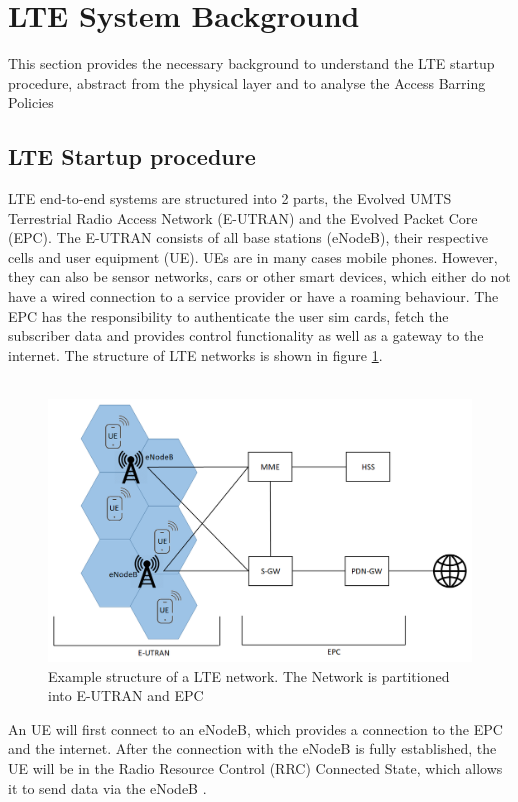 \documentclass[conference]{IEEEtran}
\begin{document}
\section{LTE System Background}
This section provides the necessary background to understand the LTE startup procedure, abstract from the physical layer and to analyse the Access Barring Policies
\subsection{LTE Startup procedure}
LTE end-to-end systems are structured into 2 parts, the Evolved UMTS Terrestrial Radio Access Network (E-UTRAN) and the Evolved Packet Core (EPC).
The E-UTRAN consists of all base stations (eNodeB), their respective cells and user equipment (UE).
UEs are in many cases mobile phones.
However, they can also be sensor networks, cars or other smart devices, which either do not have a wired connection to a service provider or have a roaming behaviour.
The EPC has the responsibility to authenticate the user sim cards, fetch the subscriber data and provides control functionality as well as a gateway to the internet.
The structure of LTE networks is shown in figure \ref{fig:LTE_Network}.\\\\
\begin{figure}
    \centering
    \includegraphics[width= \columnwidth]{Figures/LTE_Netzwerk.png}
    \caption{Example structure of a LTE network. The Network is partitioned into E-UTRAN and EPC}
    \label{fig:LTE_Network}
\end{figure}
An UE will first connect to an eNodeB, which provides a connection to the EPC and the internet.
After the connection with the eNodeB is fully established, the UE will be in the Radio Resource Control (RRC) Connected State, which allows it to send data via the eNodeB .
\end{document}
